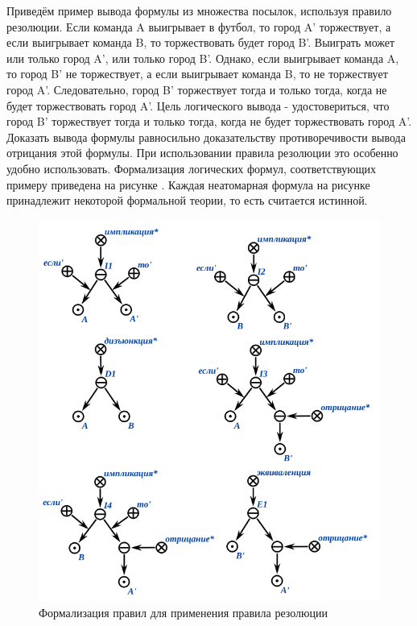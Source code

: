 Приведём пример вывода формулы из множества посылок, используя правило резолюции.
Если команда A выигрывает в футбол, то город A' торжествует, а если выигрывает команда B, то торжествовать будет город B'. Выиграть может или только город A', или только город B'. Однако, если выигрывает команда A, то город B' не торжествует, а если выигрывает команда B, то не торжествует город A'. Следовательно, город B' торжествует тогда и только тогда, когда не будет торжествовать город A'. Цель логического вывода - удостовериться, что город B' торжествует тогда и только тогда, когда не будет торжествовать город A'. Доказать вывода формулы равносильно доказательству противоречивости вывода отрицания этой формулы. При использовании правила резолюции это особенно удобно использовать.
Формализация логических формул, соответствующих примеру приведена на рисунке \textit{}. Каждая неатомарная формула на рисунке принадлежит некоторой формальной теории, то есть считается истинной.

\begin{figure}[H]
	\includegraphics[scale=0.8]{author/part3/figures/resolution_formulas_example.png}
	\caption{Формализация правил для применения правила резолюции}
	\label{fig:resolution_formulas_example}
\end{figure}

